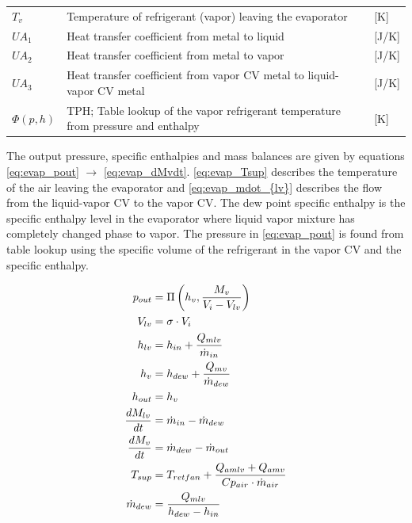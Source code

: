 \begin{center}
\begin{tabular}{l p{10cm} l}
		$T_{v}$         & Temperature of refrigerant (vapor) leaving the evaporator                         & [\si{K}]                          \\
		$UA_1$          & Heat transfer coefficient from metal to liquid                                    & [\si{J}/\si{K}]                   \\
		$UA_2$          & Heat transfer coefficient from metal to vapor                                     & [\si{J}/\si{K}]                   \\
		$UA_3$          & Heat transfer coefficient from vapor CV metal to liquid-vapor CV metal            & [\si{J}/\si{K}]                   \\
		$\Phi(p,h)$     & TPH; Table lookup of the vapor refrigerant temperature from pressure and enthalpy & [\si{K}]
	\end{tabular}
\end{center}

\medskip
The output pressure, specific enthalpies and mass balances are given by equations \cref{eq:evap_pout} $\rightarrow$ \cref{eq:evap_dMvdt}. \cref{eq:evap_Tsup} describes the temperature of the air leaving the evaporator and \cref{eq:evap_mdot_{lv}} describes the flow from the liquid-vapor CV to the vapor CV. The dew point specific enthalpy is the specific enthalpy level in the evaporator where liquid vapor mixture has completely changed phase to vapor. The pressure in \cref{eq:evap_pout} is found from table lookup using the specific volume of the refrigerant in the vapor CV and the specific enthalpy.

\begin{align}
	p_{out}            & = \Pi \left( h_v, \frac{M_v}{V_i-V_{lv}} \right)		\label{eq:evap_pout}                       \\
	V_{lv}             & = \sigma \cdot V_i                                                                           \\
	h_{lv}             & = h_{in} + \frac{Q_{mlv}}{\dot{m}_{in}}                                                      \\
	h_v                & = h_{dew} + \frac{Q_{mv}}{\dot{m}_{dew}}                                                     \\
	h_{out}            & = h_v                                                                                        \\
	\frac{dM_{lv}}{dt} & = \dot{m}_{in} - \dot{m}_{dew}                                                               \\
	\frac{dM_v}{dt}    & = \dot{m}_{dew} - \dot{m}_{out}                   \label{eq:evap_dMvdt}                      \\
	T_{sup}            & = T_{retfan} +  \frac{Q_{amlv} + Q_{amv}}{Cp_{air} \cdot \dot{m}_{air}} \label{eq:evap_Tsup} \\
	\dot{m}_{dew}      & = \frac{Q_{mlv}}{h_{dew} - h_{in}} \label{eq:evap_mdot_{lv}}
\end{align}



